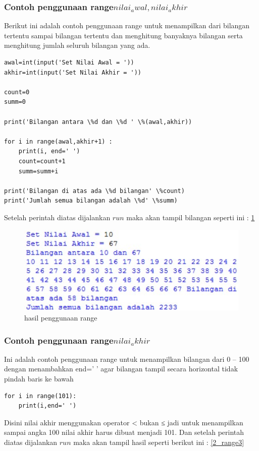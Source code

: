 \subsubsection{Contoh penggunaan range\(nilai_awal,nilai_akhir\)}
Berikut ini adalah contoh penggunaan range untuk menampilkan dari bilangan tertentu sampai bilangan tertentu dan menghitung banyaknya bilangan serta menghitung jumlah seluruh bilangan yang ada.
\begin{verbatim}
awal=int(input('Set Nilai Awal = '))
akhir=int(input('Set Nilai Akhir = '))

count=0
summ=0

print('Bilangan antara \%d dan \%d ' \%(awal,akhir))

for i in range(awal,akhir+1) :
	print(i, end=' ')
	count=count+1
	summ=summ+i

print('Bilangan di atas ada \%d bilangan' \%count)
print('Jumlah semua bilangan adalah \%d' \%summ)
\end{verbatim}

Setelah perintah diatas dijalankan \(run\) maka akan tampil bilangan seperti ini :
\ref{2_range2}

\begin{figure}[ht]
    \centerline{\includegraphics[width=1\textwidth]{figures/2_range2.JPG}}
    \caption{hasil penggunaan range}
    \label{2_range2}
    \end{figure}
    
\subsubsection{Contoh penggunaan range\(nilai_akhir\)}
Ini adalah contoh penggunaan range untuk menampilkan bilangan dari 0 – 100 dengan menambahkan end=’ ’ agar bilangan tampil secara horizontal tidak pindah baris ke bawah
\begin{verbatim}
for i in range(101):
	print(i,end=' ')
\end{verbatim}
Disini nilai akhir menggunakan operator < bukan ≤ jadi untuk menampilkan sampai angka 100 nilai akhir harus dibuat menjadi 101. Dan setelah perintah diatas dijalankan \(run\) maka akan tampil hasil seperti berikut ini :
\ref{2_range3}

